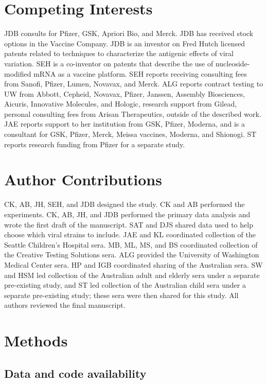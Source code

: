 \section{Competing Interests}

JDB consults for Pfizer, GSK, Apriori Bio, and Merck. JDB has received stock options in the Vaccine Company. JDB is an inventor on Fred Hutch licensed patents related to techniques to characterize the antigenic effects of viral variation. SEH is a co-inventor on patents that describe the use of nucleoside-modified mRNA as a vaccine platform. SEH reports receiving consulting fees from Sanofi, Pfizer, Lumen, Novavax, and Merck. ALG reports contract testing to UW from Abbott, Cepheid, Novavax, Pfizer, Janssen, Assembly Biosciences, Aicuris, Innovative Molecules, and Hologic, research support from Gilead, personal consulting fees from Arisan Therapeutics, outside of the described work. JAE reports support to her institution from GSK, Pfizer, Moderna, and is a consultant for GSK, Pfizer, Merck, Meissa vaccines, Moderna, and Shionogi. ST reports research funding from Pfizer for a separate study.

\section{Author Contributions}

CK, AB, JH, SEH, and JDB designed the study. CK and AB performed the experiments. CK, AB, JH, and JDB performed the primary data analysis and wrote the first draft of the manuscript. SAT and DJS shared data used to help choose which viral strains to include. JAE and KL coordinated collection of the Seattle Children's Hospital sera. MB, ML, MS, and BS coordinated collection of the Creative Testing Solutions sera. ALG provided the University of Washington Medical Center sera. HP and IGB coordinated sharing of the Australian sera. SW and HSM led collection of the Australian adult and elderly sera under a separate pre-existing study, and ST led collection of the Australian child sera under a separate pre-existing study; these sera were then shared for this study. All authors reviewed the final manuscript.

\section{Methods}

\subsection{Data and code availability}

